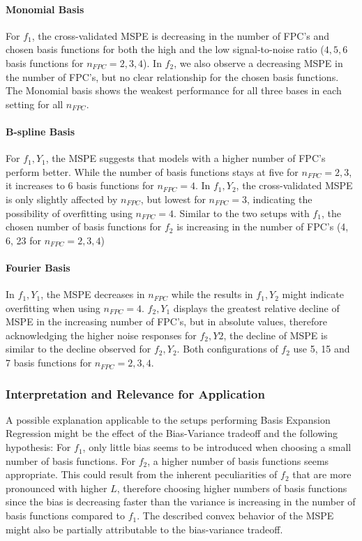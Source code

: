 \documentclass[11pt,twoside,a4paper]{article}
\begin{document}
	\paragraph{Monomial Basis}
	For $f_1$, the cross-validated MSPE is decreasing in the number of FPC's and chosen basis functions for both the high and the low signal-to-noise ratio ($4,5,6$ basis functions for $n_{FPC} = 2, 3, 4$). In  $f_2$, we also observe a decreasing MSPE in the number of FPC's, but no clear relationship for the chosen basis functions. The Monomial basis shows the weakest performance for all three bases in each setting for all $n_{FPC}$.
	\vspace{-0.2cm}
	
	\paragraph{B-spline Basis}
	For $f_1,Y_1$, the MSPE suggests that models with a higher number of FPC's perform better. While the number of basis functions stays at five for $n_{FPC} = 2,3$, it increases to 6 basis functions for $n_{FPC} = 4$. In $f_1,Y_2$, the cross-validated MSPE is only slightly affected by $n_{FPC}$, but lowest for $n_{FPC} = 3$, indicating the possibility of overfitting using $n_{FPC} = 4$. Similar to the two setups with $f_1$, the chosen number of basis functions for $f_2$ is increasing in the number of FPC's (4, 6, 23 for $n_{FPC} = 2, 3, 4$)
	\vspace{-0.2cm}
	
	\paragraph{Fourier Basis}
	In $f_1,Y_1$, the MSPE decreases in $n_{FPC}$ while the results in $f_1,Y_2$ might indicate overfitting when using $n_{FPC} = 4$. $f_2,Y_1$ displays the greatest relative decline of MSPE in the increasing number of FPC's, but in absolute values, therefore acknowledging the higher noise responses for $f_2,Y2$, the decline of MSPE is similar to the decline observed for $f_2,Y_2$. Both configurations of $f_2$ use 5, 15 and 7 basis functions for $n_{FPC} = 2, 3, 4$.
	\vspace{-0.2cm}	
	
	\subsubsection{Interpretation and Relevance for Application}
	A possible explanation applicable to the setups performing Basis Expansion Regression might be the effect of the Bias-Variance tradeoff and the following hypothesis: For $f_1$, only little bias seems to be introduced when choosing a small number of basis functions. For $f_2$, a higher number of basis functions seems appropriate. This could result from the inherent peculiarities of $f_2$ that are more pronounced with higher $L$, therefore choosing higher numbers of basis functions since the bias is decreasing faster than the variance is increasing in the number of basis functions compared to $f_1$. The described convex behavior of the MSPE might also be partially attributable to the bias-variance tradeoff.  
	
\end{document}
